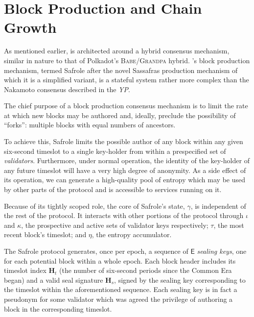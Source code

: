 \section{Block Production and Chain Growth}\label{sec:blockproduction}

As mentioned earlier, \Jam is architected around a hybrid consensus mechanism, similar in nature to that of Polkadot's \textsc{Babe}/\textsc{Grandpa} hybrid. \Jam's block production mechanism, termed Safrole after the novel Sassafras production mechanism of which it is a simplified variant, is a stateful system rather more complex than the Nakamoto consensus described in the \emph{YP}.

The chief purpose of a block production consensus mechanism is to limit the rate at which new blocks may be authored and, ideally, preclude the possibility of ``forks'': multiple blocks with equal numbers of ancestors.

To achieve this, Safrole limits the possible author of any block within any given six-second timeslot to a single key-holder from within a prespecified set of \emph{validators}. Furthermore, under normal operation, the identity of the key-holder of any future timeslot will have a very high degree of anonymity. As a side effect of its operation, we can generate a high-quality pool of entropy which may be used by other parts of the protocol and is accessible to services running on it.

Because of its tightly scoped role, the core of Safrole's state, $\gamma$, is independent of the rest of the protocol. It interacts with other portions of the protocol through $\iota$ and $\kappa$, the prospective and active sets of validator keys respectively; $\tau$, the most recent block's timeslot; and $\eta$, the entropy accumulator.

The Safrole protocol generates, once per epoch, a sequence of $\mathsf{E}$ \emph{sealing keys}, one for each potential block within a whole epoch. Each block header includes its timeslot index $\mathbf{H}_t$ (the number of six-second periods since the \Jam Common Era began) and a valid seal signature $\mathbf{H}_s$, signed by the sealing key corresponding to the timeslot within the aforementioned sequence. Each sealing key is in fact a pseudonym for some validator which was agreed the privilege of authoring a block in the corresponding timeslot.

